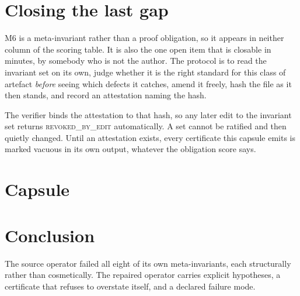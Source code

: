 \documentclass[11pt,a4paper]{article}
\theoremstyle{plain}
\theoremstyle{definition}
\theoremstyle{remark}
\begin{document}
\section{Closing the last gap}
M6 is a meta-invariant rather than a proof obligation, so it appears in neither
column of the scoring table. It is also the one open item that is closable in
minutes, by somebody who is not the author. The protocol is to read the
invariant set on its own, judge whether it is the right standard for this class
of artefact \emph{before} seeing which defects it catches, amend it freely, hash
the file as it then stands, and record an attestation naming the hash.

The verifier binds the attestation to that hash, so any later edit to the
invariant set returns \textsc{revoked\_by\_edit} automatically. A set cannot be
ratified and then quietly changed. Until an attestation exists, every
certificate this capsule emits is marked vacuous in its own output, whatever
the obligation score says.

\section{Capsule}















\section{Conclusion}
The source operator failed all eight of its own meta-invariants, each
structurally rather than cosmetically. The repaired operator carries explicit
hypotheses, a certificate that refuses to overstate itself, and a declared
failure mode.
\end{document}
